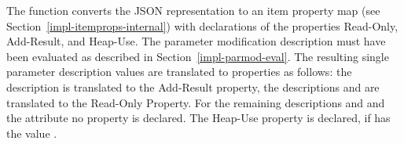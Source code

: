 The function  converts the JSON representation to an item
property map (see Section~\ref{impl-itemprops-internal}) with declarations of the properties Read-Only, Add-Result, and Heap-Use.
The parameter modification description must have been evaluated as described in Section~\ref{impl-parmod-eval}. The 
resulting single parameter description values are translated to properties as follows: the description 
is translated to the Add-Result property, the descriptions  and  are translated to the 
Read-Only Property. For the remaining descriptions  and  and the 
attribute no property is declared. The Heap-Use property is declared, if  has the value .

